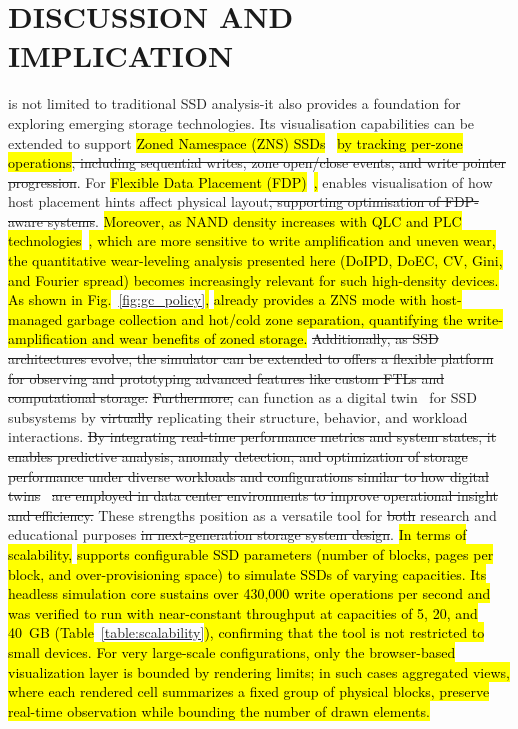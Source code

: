 \documentclass{ieeeaccess}
\begin{document}
\section{DISCUSSION AND IMPLICATION}
\label{discussion_and_implication}
\eyanassdsim is not limited to traditional SSD analysis-it also provides a foundation for exploring emerging storage technologies. Its visualisation capabilities can be extended to support \hl{Zoned Namespace (ZNS) SSDs}~\cite{zonedssd-atc21, zone-ssd} \hl{by tracking per-zone operations}\sout{, including sequential writes, zone open/close events, and write pointer progression}. For \hl{Flexible Data Placement (FDP)}~\cite{fdpssd-sdc23, flashalloc-vldb23}\hl{,} \eyanassdsim enables visualisation of how host placement hints affect physical layout\sout{, supporting optimisation of FDP-aware systems}. \hl{Moreover, as NAND density increases with QLC and PLC technologies}~\cite{qlc-imw19}\hl{, which are more sensitive to write amplification and uneven wear, the quantitative wear-leveling analysis presented here (DoIPD, DoEC, CV, Gini, and Fourier spread) becomes increasingly relevant for such high-density devices. As shown in Fig.}~\ref{fig:gc_policy}\hl{,} \eyanassdsim \hl{already provides a ZNS mode with host-managed garbage collection and hot/cold zone separation, quantifying the write-amplification and wear benefits of zoned storage.} \sout{Additionally, as SSD architectures evolve, the simulator can be extended to offers a flexible platform for observing and prototyping advanced features like custom FTLs and computational storage.} \sout{Furthermore,} \eyanassdsim can function as a digital twin~\cite{digital_twin} for SSD subsystems by \sout{virtually} replicating their structure, behavior, and workload interactions. \sout{By integrating real-time performance metrics and system states, it enables predictive analysis, anomaly detection, and optimization of storage performance under diverse workloads and configurations similar to how digital twins}~\cite{digital_twin} \sout{are employed in data center environments to improve operational insight and efficiency.} These strengths position \eyanassdsim as a versatile tool for \sout{both} research and educational purposes \sout{in next-generation storage system design}. \hl{In terms of scalability,} \eyanassdsim \hl{supports configurable SSD parameters (number of blocks, pages per block, and over-provisioning space) to simulate SSDs of varying capacities. Its headless simulation core sustains over 430{,}000 write operations per second and was verified to run with near-constant throughput at capacities of 5, 20, and 40~GB (Table}~\ref{table:scalability}\hl{), confirming that the tool is not restricted to small devices. For very large-scale configurations, only the browser-based visualization layer is bounded by rendering limits; in such cases aggregated views, where each rendered cell summarizes a fixed group of physical blocks, preserve real-time observation while bounding the number of drawn elements.}
\end{document}
